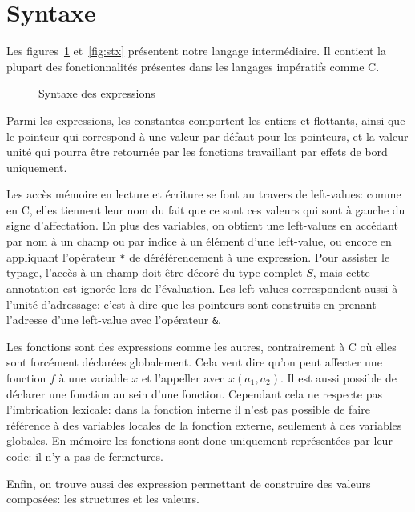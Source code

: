 \section{Syntaxe}

Les figures~\ref{fig:stx-data} et~\ref{fig:stx} présentent
notre langage intermédiaire. Il contient la plupart des fonctionnalités
présentes dans les langages impératifs comme C.

\begin{figure}%

  \figstxdata{}

  \caption{Syntaxe des expressions}
\label{fig:stx-data}
\end{figure}%

Parmi les expressions, les constantes comportent les entiers et flottants, ainsi
que le pointeur \eNull qui correspond à une valeur par défaut pour les
pointeurs, et la valeur unité \eUnit qui pourra être retournée par les fonctions
travaillant par effets de bord uniquement.

Les accès mémoire en lecture et écriture se font au travers de left-values:
comme en C, elles tiennent leur nom du fait que ce sont ces valeurs qui sont à
gauche du signe d'affectation. En plus des variables, on obtient une left-values
en accédant par nom à un champ ou par indice à un élément d'une left-value, ou
encore en appliquant l'opérateur \texttt{*} de déréférencement à une expression.
Pour assister le typage, l'accès à un champ doit être décoré du type complet
$S$, mais cette annotation est ignorée lors de l'évaluation. Les left-values
correspondent aussi à l'unité d'adressage: c'est-à-dire que les pointeurs sont
construits en prenant l'adresse d'une left-value avec l'opérateur \texttt{\&}.

Les fonctions sont des expressions comme les autres, contrairement à C où elles
sont forcément déclarées globalement. Cela veut dire qu'on peut affecter une
fonction $f$ à une variable $x$ et l'appeller avec $x(a_1, a_2)$. Il est aussi
possible de déclarer une fonction au sein d'une fonction. Cependant cela ne
respecte pas l'imbrication lexicale: dans la fonction interne il n'est pas
possible de faire référence à des variables locales de la fonction externe,
seulement à des variables globales. En mémoire les fonctions sont donc
uniquement représentées par leur code: il n'y a pas de fermetures.

Enfin, on trouve aussi des expression permettant de construire des valeurs
composées: les structures et les valeurs.

